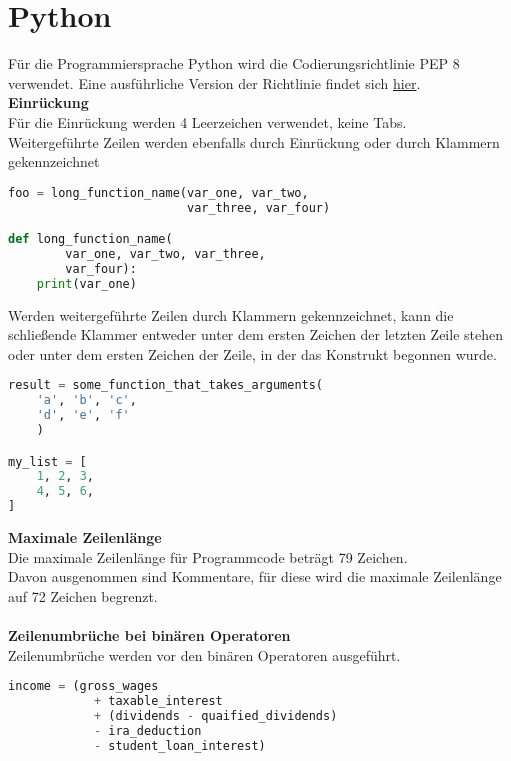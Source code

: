 \section{Python}
Für die Programmiersprache Python wird die Codierungsrichtlinie PEP 8 verwendet. Eine ausführliche Version der Richtlinie findet sich \href{https://pep8.org/}{hier}. \\
\textbf{Einrückung}\\
Für die Einrückung werden 4 Leerzeichen verwendet, keine Tabs.\\
Weitergeführte Zeilen werden ebenfalls durch Einrückung oder durch Klammern gekennzeichnet \\
\begin{lstlisting}[language = Python, caption = Weitergeführte Zeilen gekennzeichnet durch Einrückungen, label = lst:Einrückungen]
foo = long_function_name(var_one, var_two,
						 var_three, var_four)

def long_function_name(
		var_one, var_two, var_three,
		var_four):
	print(var_one)
\end{lstlisting}

Werden weitergeführte Zeilen durch Klammern gekennzeichnet, kann die schließende Klammer entweder unter dem ersten Zeichen der letzten Zeile stehen oder unter dem ersten Zeichen der Zeile, in der das Konstrukt begonnen wurde.\\
\begin{lstlisting}[language = Python, caption = Weitergeführte Zeilen gekennzeichnet durch Klammern, label = lst:klammern]
result = some_function_that_takes_arguments(
	'a', 'b', 'c',
	'd', 'e', 'f'
	)

my_list = [
	1, 2, 3,
	4, 5, 6,
]
\end{lstlisting}

\textbf{Maximale Zeilenlänge}\\
Die maximale Zeilenlänge für Programmcode beträgt 79 Zeichen. \\
Davon ausgenommen sind Kommentare, für diese wird die maximale Zeilenlänge auf 72 Zeichen begrenzt.\\ \\

\textbf{Zeilenumbrüche bei binären Operatoren}\\
Zeilenumbrüche werden vor den binären Operatoren ausgeführt.
\begin{lstlisting}[language = Python, caption = Zeilenumbrüche bei binären Operatoren, label = lst:zeilenumbruch]
income = (gross_wages
			+ taxable_interest
			+ (dividends - quaified_dividends)
			- ira_deduction
			- student_loan_interest)
\end{lstlisting}

